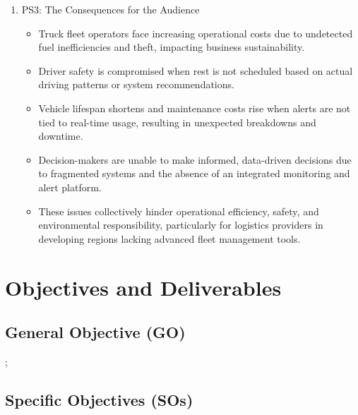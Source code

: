 \begin{enumerate}
	\item PS3:  The Consequences for the Audience		
	\begin{itemize}
			\item Truck fleet operators face increasing operational costs due to undetected fuel inefficiencies and theft, impacting business sustainability.
			\item Driver safety is compromised when rest is not scheduled based on actual driving patterns or system recommendations.
			\item Vehicle lifespan shortens and maintenance costs rise when alerts are not tied to real-time usage, resulting in unexpected breakdowns and downtime.
			\item Decision-makers are unable to make informed, data-driven decisions due to fragmented systems and the absence of an integrated monitoring and alert platform.
			\item These issues collectively hinder operational efficiency, safety, and environmental responsibility, particularly for logistics providers in developing regions lacking advanced fleet management tools.
	\end{itemize}

\end{enumerate}

\section{Objectives and Deliverables}

\subsection{General Objective (GO)}
;

\subsection{Specific Objectives (SOs)}

